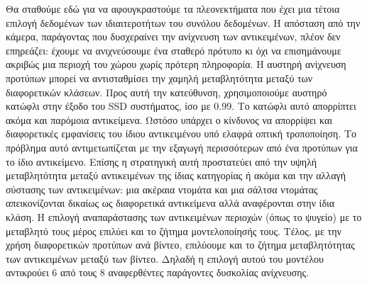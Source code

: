 \documentclass[11pt,a4paper,english,greek,twoside]{../Thesis}
\begin{document}
\par Θα σταθούμε εδώ για να αφουγκραστούμε τα πλεονεκτήματα που έχει μια τέτοια επιλογή δεδομένων των ιδιαιτεροτήτων του συνόλου δεδομένων. Η απόσταση από την κάμερα, παράγοντας που δυσχεραίνει την ανίχνευση των αντικειμένων, πλέον δεν επηρεάζει: έχουμε να ανιχνεύσουμε ένα σταθερό πρότυπο κι όχι να επισημάνουμε ακριβώς μια περιοχή του χώρου χωρίς πρότερη πληροφορία. Η αυστηρή ανίχνευση προτύπων μπορεί να αντισταθμίσει την χαμηλή μεταβλητότητα μεταξύ των διαφορετικών κλάσεων. Προς αυτή την κατεύθυνση, χρησιμοποιούμε αυστηρό κατώφλι στην έξοδο του SSD συστήματος, ίσο με 0.99. Το κατώφλι αυτό απορρίπτει ακόμα και παρόμοια αντικείμενα. Ωστόσο υπάρχει ο κίνδυνος να απορρίψει και διαφορετικές εμφανίσεις του ίδιου αντικειμένου υπό ελαφρά οπτική τροποποίηση. Το πρόβλημα αυτό αντιμετωπίζεται με την εξαγωγή περισσότερων από ένα προτύπων για το ίδιο αντικείμενο. Επίσης η στρατηγική αυτή προστατεύει από την υψηλή μεταβλητότητα μεταξύ αντικειμένων της ίδιας κατηγορίας ή ακόμα και την αλλαγή σύστασης των αντικειμένων: μια ακέραια ντομάτα και μια σάλτσα ντομάτας απεικονίζονται δικαίως ως διαφορετικά αντικείμενα αλλά αναφέρονται στην ίδια κλάση. Η επιλογή αναπαράστασης των αντικειμένων περιοχών (όπως το ψυγείο) με το μεταβλητό τους μέρος επιλύει και το ζήτημα μοντελοποίησής τους. Τέλος, με την χρήση διαφορετικών προτύπων ανά βίντεο, επιλύουμε και το ζήτημα μεταβλητότητας των αντικειμένων μεταξύ των βίντεο. Δηλαδή η επιλογή αυτού του μοντέλου αντικρούει 6 από τους 8 αναφερθέντες παράγοντες δυσκολίας ανίχνευσης.
\end{document}
